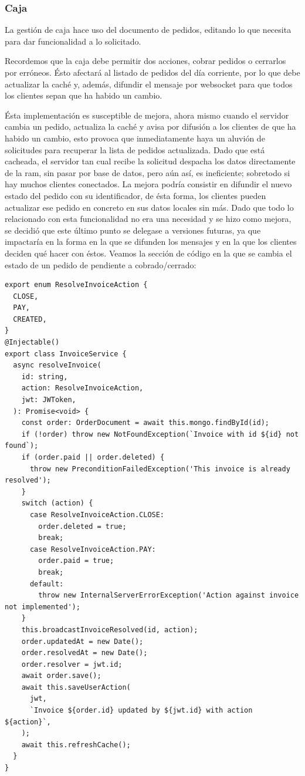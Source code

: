 \subsubsection{Caja}
La gestión de caja hace uso del documento de pedidos, editando lo que necesita para dar funcionalidad a lo solicitado.
\vspace{1em}
\par Recordemos que la caja debe permitir dos acciones, cobrar pedidos o cerrarlos por erróneos. Ésto afectará al listado de pedidos del día corriente, por lo que debe actualizar la caché y, además, difundir el mensaje por websocket para que todos los clientes sepan que ha habido un cambio.
\vspace{1em}
\par Ésta implementación es susceptible de mejora, ahora mismo cuando el servidor cambia un pedido, actualiza la caché y avisa por difusión a los clientes de que ha habido un cambio, esto provoca que inmediatamente haya un aluvión de solicitudes para recuperar la lista de pedidos actualizada. Dado que está cacheada, el servidor tan cual recibe la solicitud despacha los datos directamente de la ram, sin pasar por base de datos, pero aún así, es ineficiente; sobretodo si hay muchos clientes conectados. La mejora podría consistir en difundir el nuevo estado del pedido con su identificador, de ésta forma, los clientes pueden actualizar ese pedido en concreto en sus datos locales sin más. Dado que todo lo relacionado con esta funcionalidad no era una necesidad y se hizo como mejora, se decidió que este último punto se delegase a versiones futuras, ya que impactaría en la forma en la que se difunden los mensajes y en la que los clientes deciden qué hacer con éstos.
\clearpage
Veamos la sección de código en la que se cambia el estado de un pedido de pendiente a cobrado/cerrado:
\vspace{1em}
\par 
\begin{lstlisting}[caption={Invoice service: Resolver pedido},label=cod:service-invoice-resolve-order]
export enum ResolveInvoiceAction {
  CLOSE,
  PAY,
  CREATED,
}
@Injectable()
export class InvoiceService {
  async resolveInvoice(
    id: string,
    action: ResolveInvoiceAction,
    jwt: JWToken,
  ): Promise<void> {
    const order: OrderDocument = await this.mongo.findById(id);
    if (!order) throw new NotFoundException(`Invoice with id ${id} not found`);
    if (order.paid || order.deleted) {
      throw new PreconditionFailedException('This invoice is already resolved');
    }
    switch (action) {
      case ResolveInvoiceAction.CLOSE:
        order.deleted = true;
        break;
      case ResolveInvoiceAction.PAY:
        order.paid = true;
        break;
      default:
        throw new InternalServerErrorException('Action against invoice not implemented');
    }
    this.broadcastInvoiceResolved(id, action);
    order.updatedAt = new Date();
    order.resolvedAt = new Date();
    order.resolver = jwt.id;
    await order.save();
    await this.saveUserAction(
      jwt,
      `Invoice ${order.id} updated by ${jwt.id} with action ${action}`,
    );
    await this.refreshCache();
  }
}
\end{lstlisting}
\clearpage

